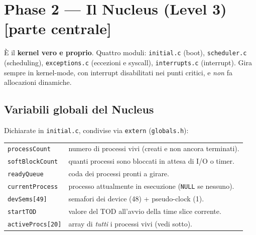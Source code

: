 \documentclass[11pt,a4paper]{article}
\newcommand{\code}[1]{\texttt{#1}}
\begin{document}
\section{Phase 2 --- Il Nucleus (Level 3) \textmd{\normalsize[parte centrale]}}

È il \textbf{kernel vero e proprio}. Quattro moduli:
\code{initial.c} (boot), \code{scheduler.c} (scheduling),
\code{exceptions.c} (eccezioni e syscall), \code{interrupts.c} (interrupt).
Gira sempre in kernel-mode, con interrupt disabilitati nei punti critici, e
\emph{non} fa allocazioni dinamiche.

\subsection{Variabili globali del Nucleus}
Dichiarate in \code{initial.c}, condivise via \code{extern} (\code{globals.h}):
\begin{center}
\begin{tabular}{@{}lp{10cm}@{}}
\toprule
\code{processCount} & numero di processi vivi (creati e non ancora terminati). \\
\code{softBlockCount} & quanti processi sono bloccati in attesa di I/O o timer. \\
\code{readyQueue} & coda dei processi pronti a girare. \\
\code{currentProcess} & processo attualmente in esecuzione (\code{NULL} se nessuno). \\
\code{devSems[49]} & semafori dei device (48) + pseudo-clock (1). \\
\code{startTOD} & valore del TOD all'avvio della time slice corrente. \\
\code{activeProcs[20]} & array di \emph{tutti} i processi vivi (vedi sotto). \\
\bottomrule
\end{tabular}
\end{center}
\end{document}
